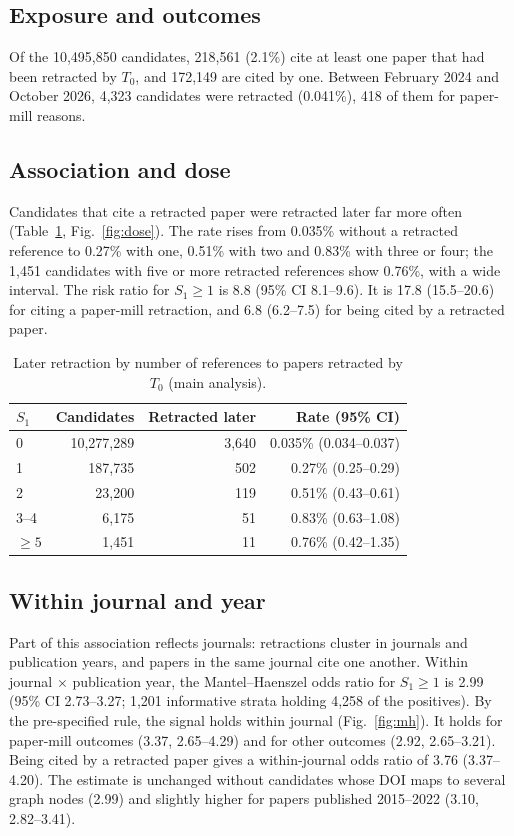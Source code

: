 \documentclass[pdflatex,sn-basic]{sn-jnl}
\begin{document}
\subsection{Exposure and outcomes}
Of the 10,495,850 candidates, 218,561 (2.1\%) cite at least one paper that had been retracted by $T_0$, and 172,149
are cited by one. Between February 2024 and October 2026, 4,323 candidates were retracted (0.041\%), 418 of them for
paper-mill reasons.

\subsection{Association and dose}
Candidates that cite a retracted paper were retracted later far more often (Table~\ref{tab:dose}, Fig.~\ref{fig:dose}). The rate rises from
0.035\% without a retracted reference to 0.27\% with one, 0.51\% with two and 0.83\% with three or four; the
1,451 candidates with five or more retracted references show 0.76\%, with a wide interval. The risk ratio for
$S_1 \ge 1$ is 8.8 (95\% CI 8.1--9.6). It is 17.8 (15.5--20.6) for citing a paper-mill retraction, and 6.8
(6.2--7.5) for being cited by a retracted paper.

\begin{table}[t]
\centering
\caption{Later retraction by number of references to papers retracted by $T_0$ (main analysis).}\label{tab:dose}
\begin{tabular}{lrrr}
\toprule
$S_1$ & Candidates & Retracted later & Rate (95\% CI) \\
\midrule
0 & 10,277,289 & 3,640 & 0.035\% (0.034--0.037) \\
1 & 187,735 & 502 & 0.27\% (0.25--0.29) \\
2 & 23,200 & 119 & 0.51\% (0.43--0.61) \\
3--4 & 6,175 & 51 & 0.83\% (0.63--1.08) \\
$\ge 5$ & 1,451 & 11 & 0.76\% (0.42--1.35) \\
\bottomrule
\end{tabular}
\end{table}

\subsection{Within journal and year}
Part of this association reflects journals: retractions cluster in journals and publication years, and papers in the
same journal cite one another. Within journal $\times$ publication year, the Mantel--Haenszel odds ratio for
$S_1 \ge 1$ is 2.99 (95\% CI 2.73--3.27; 1,201 informative strata holding 4,258 of the positives). By the
pre-specified rule, the signal holds within journal (Fig.~\ref{fig:mh}). It holds for paper-mill outcomes (3.37, 2.65--4.29) and for
other outcomes (2.92, 2.65--3.21). Being cited by a retracted paper gives a within-journal odds ratio of 3.76
(3.37--4.20). The estimate is unchanged without candidates whose DOI maps to several graph nodes (2.99) and slightly
higher for papers published 2015--2022 (3.10, 2.82--3.41).
\end{document}
